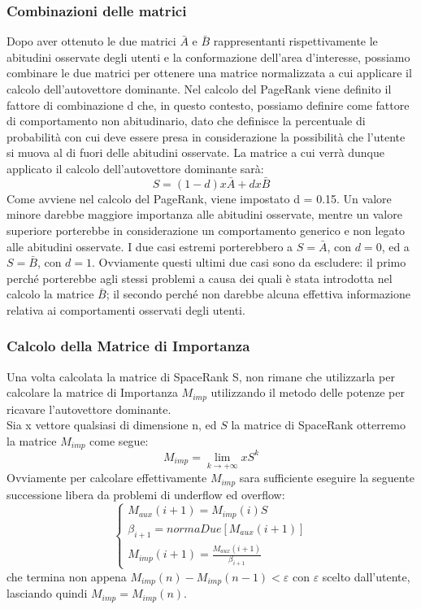\subsubsection{Combinazioni delle matrici}
Dopo aver ottenuto le due matrici $\bar{A}$ e $\bar{B}$ rappresentanti rispettivamente
le abitudini osservate degli utenti e la conformazione dell'area d'interesse,
possiamo combinare le due matrici per ottenere una matrice normalizzata a cui applicare
il calcolo dell'autovettore dominante. Nel calcolo del PageRank viene definito il fattore
di combinazione d che, in questo contesto, possiamo definire come fattore di
comportamento non abitudinario, dato che definisce la percentuale di probabilit\`a
con cui deve essere presa in considerazione la possibilit\`a che l'utente
si muova al di fuori delle abitudini osservate. La matrice a cui verr\`a dunque
applicato il calcolo dell'autovettore dominante sar\`a:
$$
S = (1 - d) x \bar{A} + d x \bar{B}
$$
Come avviene nel calcolo del PageRank, viene impostato d = 0.15. Un valore minore
darebbe maggiore importanza alle abitudini osservate, mentre un valore superiore
porterebbe in considerazione un comportamento generico e non legato alle abitudini
osservate. I due casi estremi porterebbero a $S = \bar{A}$, con $d = 0$,
ed a $S = \bar{B}$, con $d = 1$. Ovviamente questi ultimi due casi sono da
escludere: il primo perch\'e porterebbe agli stessi problemi a causa dei quali \`e
stata introdotta nel calcolo la matrice $\bar{B}$; il secondo perch\'e non darebbe
alcuna effettiva informazione relativa ai comportamenti osservati degli utenti.

\subsubsection{Calcolo della Matrice di Importanza}
Una volta calcolata la matrice di SpaceRank S, non rimane che utilizzarla per
calcolare la matrice di Importanza $M_{imp}$ utilizzando il metodo delle potenze
per ricavare l'autovettore dominante.\\
Sia x vettore qualsiasi di dimensione n, ed $S$ la matrice di SpaceRank otterremo
la matrice $M_{imp}$ come segue:
\begin{equation}
M_{imp} = \lim_{k \rightarrow +\infty} x S^{k}
\end{equation}
Ovviamente per calcolare effettivamente $M_{imp}$ sara sufficiente eseguire la seguente
successione libera da problemi di underflow ed overflow:
\begin{equation}
\left\{\begin{matrix}
M_{aux}(i+1) = M_{imp}(i)S
\\ \beta_{i+1} = normaDue[M_{aux}(i+1)]
\\ M_{imp}(i+1) = \frac{M_{aux}(i+1)}{\beta_{i+1}}
\end{matrix}\right.
\end{equation}
che termina non appena $ M_{imp}(n) - M_{imp}(n- 1) < \varepsilon $ con $ \varepsilon $ scelto dall'utente,
lasciando quindi $ M_{imp} = M_{imp}(n) $.

